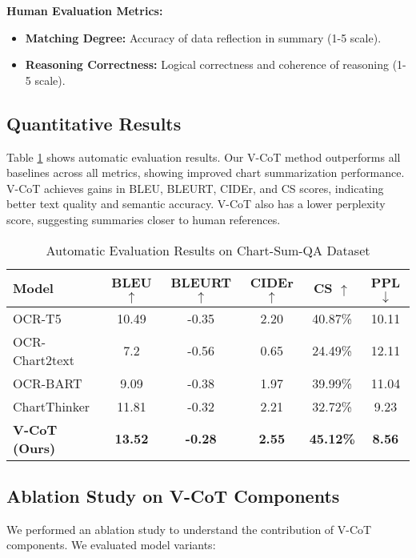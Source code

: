 \textbf{Human Evaluation Metrics:}
\begin{itemize}
    \item \textbf{Matching Degree:} Accuracy of data reflection in summary (1-5 scale).
    \item \textbf{Reasoning Correctness:} Logical correctness and coherence of reasoning (1-5 scale).
\end{itemize}

\subsection{Quantitative Results}

Table \ref{tab:automatic_evaluation} shows automatic evaluation results. Our V-CoT method outperforms all baselines across all metrics, showing improved chart summarization performance. V-CoT achieves gains in BLEU, BLEURT, CIDEr, and CS scores, indicating better text quality and semantic accuracy. V-CoT also has a lower perplexity score, suggesting summaries closer to human references.

\begin{table}[!t]\small
    \centering
    \caption{Automatic Evaluation Results on Chart-Sum-QA Dataset}
    \begin{tabular}{lccccc}
        \toprule
        Model & BLEU $\uparrow$ & BLEURT $\uparrow$ & CIDEr $\uparrow$ & CS $\uparrow$ & PPL $\downarrow$ \\
        \midrule
        OCR-T5 & 10.49 & -0.35 & 2.20 & 40.87\% & 10.11 \\
        OCR-Chart2text & 7.2 & -0.56 & 0.65 & 24.49\% & 12.11 \\
        OCR-BART & 9.09 & -0.38 & 1.97 & 39.99\% & 11.04 \\
        ChartThinker & 11.81 & -0.32 & 2.21 & 32.72\% & 9.23 \\
        \textbf{V-CoT (Ours)} & \textbf{13.52} & \textbf{-0.28} & \textbf{2.55} & \textbf{45.12\%} & \textbf{8.56} \\
        \bottomrule
    \end{tabular}
    \label{tab:automatic_evaluation}
\end{table}


\subsection{Ablation Study on V-CoT Components}

We performed an ablation study to understand the contribution of V-CoT components. We evaluated model variants:

